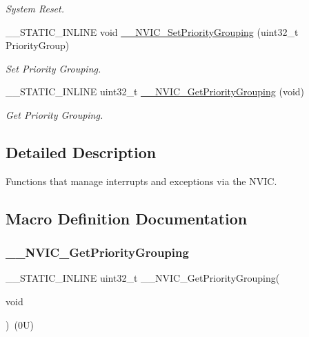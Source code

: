 \begin{DoxyCompactItemize}
\begin{DoxyCompactList}\small\item\em System Reset. \end{DoxyCompactList}\item 
\+\_\+\+\_\+\+S\+T\+A\+T\+I\+C\+\_\+\+I\+N\+L\+I\+NE void \mbox{\hyperlink{group___c_m_s_i_s___core___n_v_i_c_functions_gafc94dcbaee03e4746ade1f5bb9aaa56d}{\+\_\+\+\_\+\+N\+V\+I\+C\+\_\+\+Set\+Priority\+Grouping}} (uint32\+\_\+t Priority\+Group)
\begin{DoxyCompactList}\small\item\em Set Priority Grouping. \end{DoxyCompactList}\item 
\+\_\+\+\_\+\+S\+T\+A\+T\+I\+C\+\_\+\+I\+N\+L\+I\+NE uint32\+\_\+t \mbox{\hyperlink{group___c_m_s_i_s___core___n_v_i_c_functions_ga9b894af672df4373eb637f8288845c05}{\+\_\+\+\_\+\+N\+V\+I\+C\+\_\+\+Get\+Priority\+Grouping}} (void)
\begin{DoxyCompactList}\small\item\em Get Priority Grouping. \end{DoxyCompactList}\end{DoxyCompactItemize}


\subsection{Detailed Description}
Functions that manage interrupts and exceptions via the N\+V\+IC. 



\subsection{Macro Definition Documentation}
\mbox{\label{group___c_m_s_i_s___core___n_v_i_c_functions_gae1de06155d072758b3453edb07d12459}} 
\subsubsection{\texorpdfstring{\_\_NVIC\_GetPriorityGrouping}{\_\_NVIC\_GetPriorityGrouping}}
{\footnotesize\ttfamily \+\_\+\+\_\+\+S\+T\+A\+T\+I\+C\+\_\+\+I\+N\+L\+I\+NE uint32\+\_\+t \+\_\+\+\_\+\+N\+V\+I\+C\+\_\+\+Get\+Priority\+Grouping(\begin{DoxyParamCaption}\item[{}]{void }\end{DoxyParamCaption})~(0\+U)}



